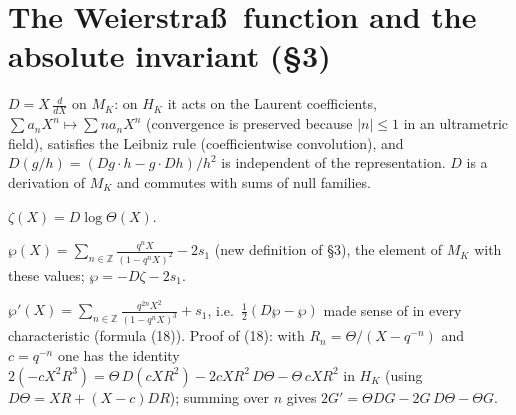 \section{The Weierstra\ss\ function and the absolute invariant (\S 3)}

\begin{definition}[Derivation $D$]
\label{def:D-operator}
\leanok
$D=X\,\frac{d}{dX}$ on $M_K$: on $H_K$ it acts on the Laurent coefficients, $\sum a_nX^n\mapsto\sum na_nX^n$ (convergence is preserved because $|n|\le1$ in an ultrametric field), satisfies the Leibniz rule (coefficientwise convolution), and $D(g/h)=(Dg\cdot h-g\cdot Dh)/h^2$ is independent of the representation. $D$ is a derivation of $M_K$ and commutes with sums of null families.
\end{definition}

\begin{definition}[$\zeta=D\log\Theta$]
\label{def:zeta}
\leanok
$\zeta(X)=D\log\Theta(X)$.
\end{definition}

\begin{definition}
\label{def:wp}
\leanok
$\wp(X)=\sum_{n\in\mathbb Z}\frac{q^nX}{(1-q^nX)^2}-2s_1$ (new definition of \S3), the element of $M_K$ with these values; $\wp=-D\zeta-2s_1$.
\end{definition}

\begin{definition}
\label{def:wp-prime}
\leanok
$\wp'(X)=\sum_{n\in\mathbb Z}\frac{q^{2n}X^2}{(1-q^nX)^3}+s_1$, i.e.\ $\tfrac12(D\wp-\wp)$ made sense of in every characteristic (formula (18)). Proof of (18): with $R_n=\Theta/(X-q^{-n})$ and $c=q^{-n}$ one has the identity $2(-cX^2R^3)=\Theta\,D(cXR^2)-2cXR^2\,D\Theta-\Theta\,cXR^2$ in $H_K$ (using $D\Theta=XR+(X-c)DR$); summing over $n$ gives $2G'=\Theta DG-2G\,D\Theta-\Theta G$.
\end{definition}

